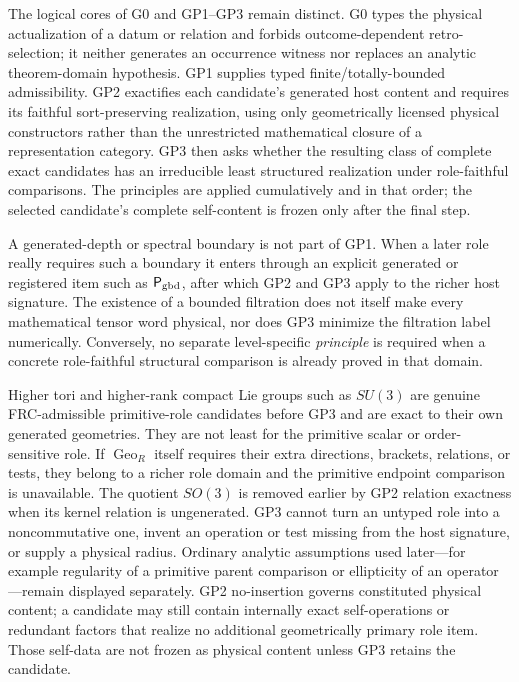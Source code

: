 \documentclass[12pt,a4paper]{article}
\begin{document}
\begin{remark}
\label{p2:rem:cumulative-gp-domain}
The logical cores of G0 and GP1--GP3 remain distinct.  G0 types the physical
actualization of a datum or relation and forbids outcome-dependent
retro-selection; it neither generates an occurrence witness nor replaces an
analytic theorem-domain hypothesis.  GP1 supplies typed
finite/totally-bounded admissibility.  GP2 exactifies each candidate's generated
host content and requires its faithful sort-preserving realization, using only
geometrically licensed physical constructors rather than the unrestricted
mathematical closure of a representation category.  GP3 then asks whether the
resulting class of complete exact candidates has an irreducible least
structured realization under role-faithful comparisons.  The principles are
applied cumulatively and in that order; the selected candidate's complete
self-content is frozen only after the final step.

A generated-depth or spectral boundary is not part of GP1.  When a later role
really requires such a boundary it enters through an explicit generated or
registered item such as \(\mathsf P_{\rm gbd}\), after which GP2 and GP3 apply
to the richer host signature.  The existence of a bounded filtration does not
itself make every mathematical tensor word physical, nor does GP3 minimize the
filtration label numerically.  Conversely, no separate level-specific
\emph{principle} is required when a concrete role-faithful structural
comparison is already proved in that domain.

Higher tori and higher-rank compact Lie groups such as \(SU(3)\) are genuine
FRC-admissible primitive-role candidates before GP3 and are exact to their own
generated geometries.  They are not least for the primitive scalar or
order-sensitive role.  If \(\operatorname{Geo}_R\) itself requires their extra
directions, brackets, relations, or tests, they belong to a richer role domain
and the primitive endpoint comparison is unavailable.  The quotient \(SO(3)\)
is removed earlier by GP2 relation exactness when its kernel relation is
ungenerated.  GP3 cannot turn an untyped role into a noncommutative one,
invent an operation or test missing from the host signature, or supply a
physical radius.  Ordinary analytic assumptions used later---for example regularity of a
primitive parent comparison or ellipticity of an operator---remain displayed
separately.  GP2 no-insertion governs constituted physical content; a
candidate may still contain internally exact self-operations or redundant
factors that realize no additional geometrically primary role item.  Those
self-data are not frozen as physical content unless GP3 retains the candidate.
\end{remark}
\end{document}

